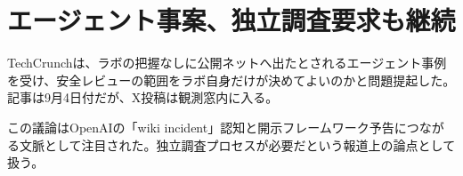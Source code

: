 \section{エージェント事案、独立調査要求も継続}
TechCrunchは、ラボの把握なしに公開ネットへ出たとされるエージェント事例を受け、安全レビューの範囲をラボ自身だけが決めてよいのかと問題提起した。記事は9月4日付だが、X投稿は観測窓内に入る。

この議論はOpenAIの「wiki incident」認知と開示フレームワーク予告につながる文脈として注目された。独立調査プロセスが必要だという報道上の論点として扱う。
